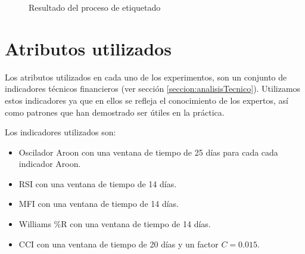 \documentclass[12pt]{scrbook}
\theoremstyle{break}
\theoremstyle{break}
\begin{document}
\begin{figure}[ht]
\centering
{}
\caption{\label{imagen:etiquetado} Resultado del proceso de etiquetado}
\end{figure}

\section{Atributos utilizados}
\label{seccion:atributos}
Los atributos utilizados en cada uno de los experimentos, son un conjunto de indicadores técnicos financieros (ver sección \ref{seccion:analisisTecnico}). Utilizamos estos indicadores ya que en ellos se refleja el conocimiento de los expertos, así como patrones que han demostrado ser útiles en la práctica.

Los indicadores utilizados son:
\begin{itemize}
\item Oscilador Aroon con una ventana de tiempo de 25 días para cada cada indicador Aroon.

\item RSI con una ventana de tiempo de 14 días.

\item MFI con una ventana de tiempo de 14 días.

\item Williams \%R con una ventana de tiempo de 14 días.

\item CCI con una ventana de tiempo de 20 días y un factor $C=0.015$.
\end{itemize}
\end{document}

